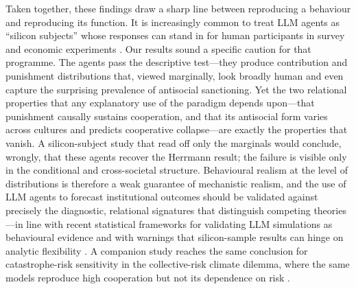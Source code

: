 \documentclass[openacc]{rsproca_new}
\begin{document}
Taken together, these findings draw a sharp line between reproducing a behaviour and reproducing its function. It is increasingly common to treat LLM agents as ``silicon subjects'' whose responses can stand in for human participants in survey and economic experiments \parencite{argyle2023out,horton2023llm,aher2023using,park2023generative}. Our results sound a specific caution for that programme. The agents pass the descriptive test---they produce contribution and punishment distributions that, viewed marginally, look broadly human and even capture the surprising prevalence of antisocial sanctioning. Yet the two relational properties that any explanatory use of the paradigm depends upon---that punishment causally sustains cooperation, and that its antisocial form varies across cultures and predicts cooperative collapse---are exactly the properties that vanish. A silicon-subject study that read off only the marginals would conclude, wrongly, that these agents recover the Herrmann result; the failure is visible only in the conditional and cross-societal structure. Behavioural realism at the level of distributions is therefore a weak guarantee of mechanistic realism, and the use of LLM agents to forecast institutional outcomes should be validated against precisely the diagnostic, relational signatures that distinguish competing theories---in line with recent statistical frameworks for validating LLM simulations as behavioural evidence \parencite{hullman2026validating} and with warnings that silicon-sample results can hinge on analytic flexibility \parencite{cummins2025threat}. A companion study reaches the same conclusion for catastrophe-risk sensitivity in the collective-risk climate dilemma, where the same models reproduce high cooperation but not its dependence on risk \parencite{companionCRSD2026}.
\end{document}
